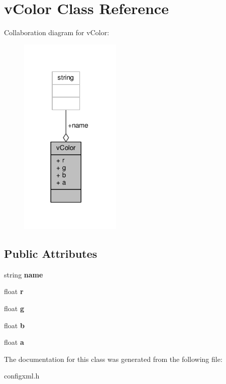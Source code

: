 \hypertarget{classvColor}{}\section{v\+Color Class Reference}
\label{classvColor}


Collaboration diagram for v\+Color\+:
\nopagebreak
\begin{figure}[H]
\begin{center}
\leavevmode
\includegraphics[width=137pt]{d1/d7c/classvColor__coll__graph}
\end{center}
\end{figure}
\subsection*{Public Attributes}
\begin{DoxyCompactItemize}
\item 
string {\bfseries name}\hypertarget{classvColor_af87a5b3faa7ac3b3f25dbe2af56717a8}{}\label{classvColor_af87a5b3faa7ac3b3f25dbe2af56717a8}

\item 
float {\bfseries r}\hypertarget{classvColor_a231623a41dc4e438eed556ea16ceec7f}{}\label{classvColor_a231623a41dc4e438eed556ea16ceec7f}

\item 
float {\bfseries g}\hypertarget{classvColor_a02416d21a1cf7c49cbea20adefe800e3}{}\label{classvColor_a02416d21a1cf7c49cbea20adefe800e3}

\item 
float {\bfseries b}\hypertarget{classvColor_a4492192898f1c711b77a340791b4e5b8}{}\label{classvColor_a4492192898f1c711b77a340791b4e5b8}

\item 
float {\bfseries a}\hypertarget{classvColor_a0d33a9f37efe76c0745f0db235ff58ff}{}\label{classvColor_a0d33a9f37efe76c0745f0db235ff58ff}

\end{DoxyCompactItemize}


The documentation for this class was generated from the following file\+:\begin{DoxyCompactItemize}
\item 
configxml.\+h\end{DoxyCompactItemize}
